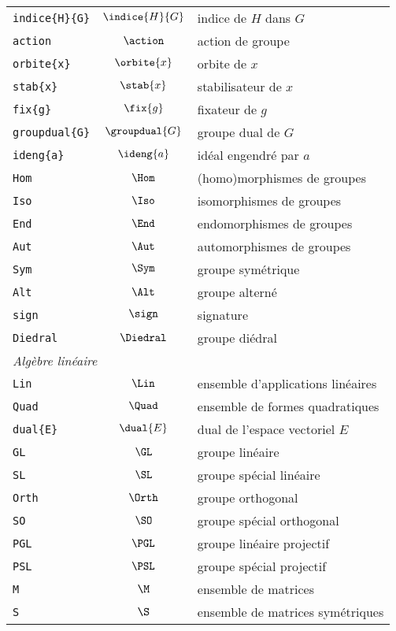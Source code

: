 \documentclass[print]{atomathematyk}
\begin{document}
\begin{longtable}{lcl}
  \texttt{indice\{H\}\{G\}} & \(\indice{H}{G}\) & indice de \(H\) dans \(G\)\\
  \texttt{action} & \(\action\) & action de groupe\\
  \texttt{orbite\{x\}} & \(\orbite{x}\) & orbite de \(x\)\\
  \texttt{stab\{x\}} & \(\stab{x}\) & stabilisateur de \(x\)\\
  \texttt{fix\{g\}} & \(\fix{g}\) & fixateur de \(g\)\\
  \texttt{groupdual\{G\}} & \(\groupdual{G}\) & groupe dual de \(G\)\\
  \texttt{ideng\{a\}} & \(\ideng{a}\) & idéal engendré par \(a\)\\
  \texttt{Hom} & \(\Hom\) & (homo)morphismes de groupes \\
  \texttt{Iso} & \(\Iso\) & isomorphismes de groupes \\
  \texttt{End} & \(\End\) & endomorphismes de groupes \\
  \texttt{Aut} & \(\Aut\) & automorphismes de groupes \\
  \texttt{Sym} & \(\Sym\) & groupe symétrique\\
  \texttt{Alt} & \(\Alt\) & groupe alterné\\
  \texttt{sign} & \(\sign\) & signature\\
  \texttt{Diedral} & \(\Diedral\) & groupe diédral\\
  \multicolumn{3}{l}{\emph{Algèbre linéaire}}\\
  \texttt{Lin} & \(\Lin\) & ensemble d’applications linéaires\\
  \texttt{Quad} & \(\Quad\) & ensemble de formes quadratiques\\
  \texttt{dual\{E\}} & \(\dual{E}\) & dual de l’espace vectoriel \(E\)\\
  \texttt{GL} & \(\GL\) & groupe linéaire\\
  \texttt{SL} & \(\SL\) & groupe spécial linéaire\\
  \texttt{Orth} & \(\Orth\) & groupe orthogonal\\
  \texttt{SO} & \(\SO\) & groupe spécial orthogonal\\
  \texttt{PGL} & \(\PGL\) & groupe linéaire projectif\\
  \texttt{PSL} & \(\PSL\) & groupe spécial projectif\\
  \texttt{M} & \(\M\) & ensemble de matrices\\
  \texttt{S} & \(\S\) & ensemble de matrices symétriques\\

\end{longtable}
\end{document}
